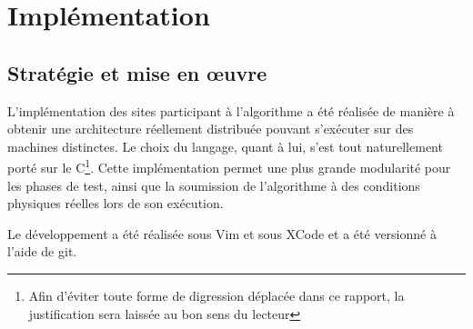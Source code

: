 
\chapter{Implémentation}\label{implementation}

\section{Stratégie et mise en \oe uvre}

L'implémentation des sites participant à l'algorithme a été réalisée de manière à obtenir une
architecture réellement distribuée pouvant s'exécuter sur des machines distinctes.
Le choix du langage, quant à lui, s'est tout naturellement porté sur le C\footnote{Afin d'éviter
	toute forme de digression déplacée dans ce rapport, la justification sera laissée au bon sens du
lecteur}. 
 Cette
implémentation permet une plus grande modularité pour les phases de test, ainsi que la soumission de
l'algorithme à des conditions physiques réelles lors de son exécution.

Le développement a été réalisée sous Vim et sous XCode et a été versionné à l'aide de git.

